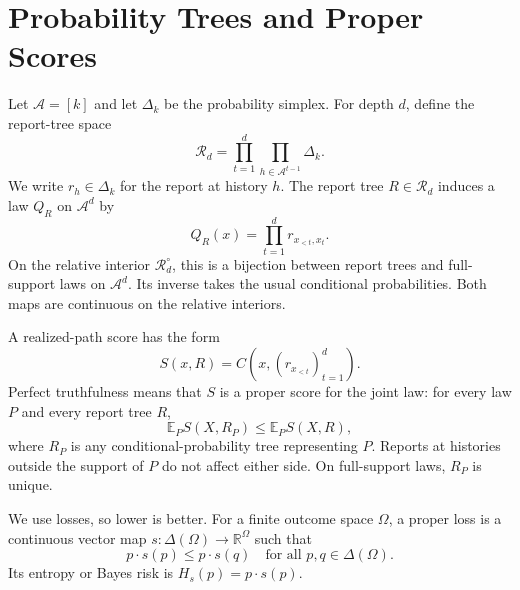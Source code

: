 \documentclass[twoside]{article}
\newcommand{\E}{\mathbb E}
\newcommand{\cA}{\mathcal A}
\newcommand{\cR}{\mathcal R}
\newcommand{\1}{\mathbf 1}
\begin{document}
\runningauthor{}


\appendix

\section{Probability Trees and Proper Scores}
\label{app:notation}

Let $\cA=[k]$ and let $\Delta_k$ be the probability simplex. For depth
$d$, define the report-tree space
\begin{equation*}
 \cR_d=\prod_{t=1}^d\prod_{h\in\cA^{t-1}}\Delta_k.
\end{equation*}
We write $r_h\in\Delta_k$ for the report at history $h$. The report tree
$R\in\cR_d$ induces a law $Q_R$ on $\cA^d$ by
\begin{equation}
 Q_R(x)=\prod_{t=1}^d r_{x_{<t},x_t}.
 \label{eq:supp-tree-law}
\end{equation}
On the relative interior $\cR_d^\circ$, this is a bijection between report
trees and full-support laws on $\cA^d$. Its inverse takes the usual
conditional probabilities. Both maps are continuous on the relative
interiors.

A realized-path score has the form
\begin{equation}
 S(x,R)=C(x,(r_{x_{<t}})_{t=1}^d).
 \label{eq:supp-path-score}
\end{equation}
Perfect truthfulness means that $S$ is a proper score for the joint law:
for every law $P$ and every report tree $R$,
\begin{equation}
 \E_P S(X,R_P)\leq \E_P S(X,R),
 \label{eq:supp-joint-proper}
\end{equation}
where $R_P$ is any conditional-probability tree representing $P$. Reports
at histories outside the support of $P$ do not affect either side. On
full-support laws, $R_P$ is unique.

We use losses, so lower is better. For a finite outcome space $\Omega$, a
proper loss is a continuous vector map $s:\Delta(\Omega)\to\mathbb R^\Omega$
such that
\begin{equation}
 p\cdot s(p)\leq p\cdot s(q)
 \quad\text{for all }p,q\in\Delta(\Omega).
 \label{eq:supp-proper}
\end{equation}
Its entropy or Bayes risk is $H_s(p)=p\cdot s(p)$.
\end{document}
